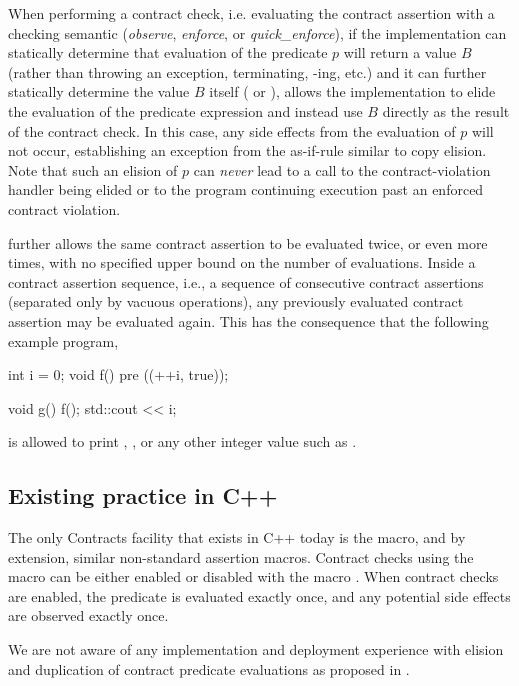 When performing a contract check, i.e. evaluating the contract assertion with a checking semantic (\emph{observe}, \emph{enforce}, or \emph{ quick_enforce}), if the implementation can statically determine that evaluation of the predicate $p$ will return a value $B$ (rather than throwing an exception, terminating, -ing, etc.) and it can further statically determine the value $B$ itself ( or ), \cite{P2900R6} allows the implementation to elide the evaluation of the predicate expression and instead use $B$ directly as the result of the contract check. In this case, any side effects from the evaluation of $p$ will not occur, establishing an exception from the as-if-rule similar to copy elision. Note that such an elision of $p$ can \emph{never} lead to a call to the contract-violation handler being elided or to the program continuing execution past an enforced contract violation.

\cite{P2900R6} further allows the same contract assertion to be evaluated twice, or even more times, with no specified upper bound on the number of evaluations. Inside a contract assertion sequence, i.e., a sequence of consecutive contract assertions (separated only by vacuous operations), any previously evaluated contract assertion may be evaluated again. This has the consequence that the following example program,
\begin{codeblock}
int i = 0; 
void f() pre ((++i, true)); 

void g() { 
  f(); 
  std::cout << i;
}
\end{codeblock}
is allowed to print , , or any other integer value such as .


\subsection{Existing practice in C++}
\label{subsec:cppexisting}

The only Contracts facility that exists in C++ today is the  macro, and by extension, similar non-standard assertion macros. Contract checks using the  macro can be either enabled or disabled with the macro . When contract checks are enabled, the predicate is evaluated exactly once, and any potential side effects are observed exactly once.

We are not aware of any implementation and deployment experience with elision and duplication of  contract predicate evaluations as proposed in \cite{P2900R6}.

